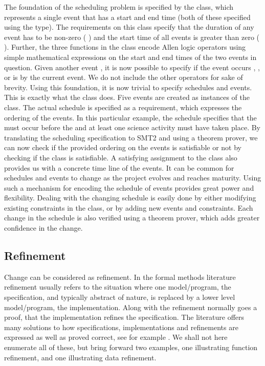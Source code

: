The foundation of the scheduling problem is specified by the
 class, which represents a single event that has a start
and end time (both of these specified using the  type). The
requirements on this class specify that the duration of any event has
to be non-zero ( ) and the start time
of all events is greater than zero (
). Further, the three functions in the 
class encode Allen logic operators using simple mathematical
expressions on the start and end times of the two events in
question. Given another event , it is now possible to specify
if the event occurs , , or is
 by the current event. We do not include the other
operators for sake of brevity. Using this foundation, it is now
trivial to specify schedules and events. This is exactly what the
 class does. Five events are created as instances of
the  class. The actual schedule is specified as a
requirement, which expresses the ordering of the events. In this
particular example, the schedule specifies that the 
must occur before the  and at least one science
activity must have taken place. By translating the scheduling
specification to SMT2 and using a theorem prover, we can now check if
the provided ordering on the events is satisfiable or not by checking
if the  class is satisfiable. A satisfying assignment
to the class also provides us with a concrete time line of the events.
It can be common for schedules and events to change as the project
evolves and reaches maturity. Using such a mechanism for encoding the
schedule of events provides great power and flexibility. Dealing with
the changing schedule is easily done by either modifying existing
constraints in the  class, or by adding new events and
constraints. Each change in the schedule is also verified using a
theorem prover, which adds greater confidence in the change.

\subsection{Refinement}

Change can be considered as refinement. In the formal methods literature
refinement usually refers to the situation where one model/program, the 
specification, and typically abstract of nature, is replaced by a lower 
level model/program, the implementation. Along with the refinement normally
goes a proof, that the implementation refines the specification.
The literature offers many solutions to how specifications, implementations and 
refinements are expressed as well as proved correct, see for example 
\cite{vdm,raise}. We shall not here enumerate all of these, but bring forward two 
examples, one illustrating function refinement, and one illustrating data 
refinement.

